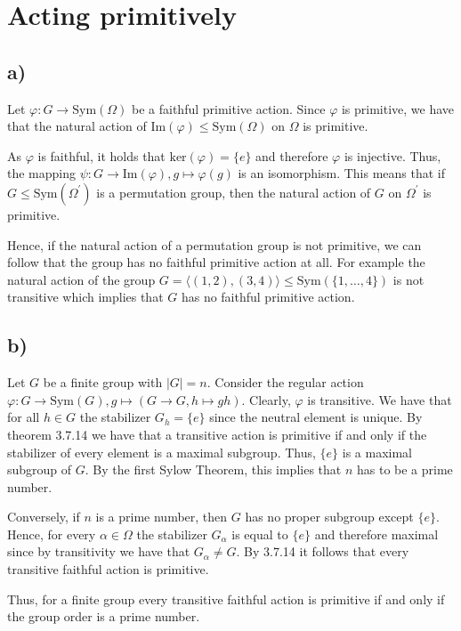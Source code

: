 \section{Acting primitively}
\subsection*{a)}
Let $\varphi : G \rightarrow \text{Sym}(\Omega)$ be a faithful primitive action. Since $\varphi$ is primitive, we have that the natural action of $\text{Im}(\varphi) \leq \text{Sym}(\Omega)$ on $\Omega$ is primitive.

As $\varphi$ is faithful, it holds that $\text{ker}(\varphi) = \{e\}$ and therefore $\varphi$ is injective. Thus, the mapping $\psi : G \rightarrow \text{Im}(\varphi), g \mapsto \varphi(g)$ is an isomorphism. This means that if $G \leq \text{Sym}(\Omega^\prime)$ is a permutation group, then the natural action of $G$ on $\Omega^\prime$ is primitive.

Hence, if the natural action of a permutation group is not primitive, we can follow that the group has no faithful primitive action at all. For example the natural action of the group $G = \langle (1,2),(3,4) \rangle \leq \text{Sym}(\{1,\dots,4\})$ is not transitive which implies that $G$ has no faithful primitive action.

\subsection*{b)}
Let $G$ be a finite group with $|G| = n$. Consider the regular action $\varphi : G \rightarrow \text{Sym}(G), g \mapsto (G \rightarrow G, h \mapsto g h)$. Clearly, $\varphi$ is transitive. We have that for all $h \in G$ the stabilizer $G_h = \{e\}$ since the neutral element is unique.
By theorem 3.7.14 we have that a transitive action is primitive if and only if the stabilizer of every element is a maximal subgroup. Thus, $\{e\}$ is a maximal subgroup of $G$. By the first Sylow Theorem, this implies that $n$ has to be a prime number.

Conversely, if $n$ is a prime number, then $G$ has no proper subgroup except $\{e\}$. Hence, for every $\alpha \in \Omega$ the stabilizer $G_\alpha$ is equal to $\{e\}$ and therefore maximal since by transitivity we have that $G_\alpha \neq G$. By 3.7.14 it follows that every transitive faithful action is primitive.

Thus, for a finite group every transitive faithful action is primitive if and only if the group order is a prime number.